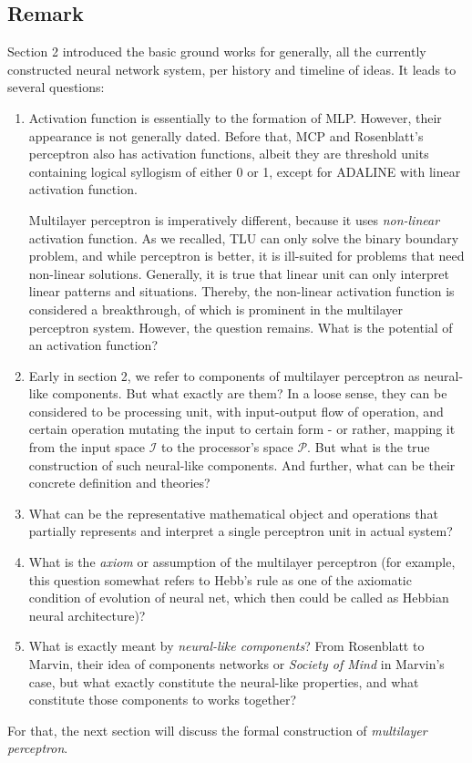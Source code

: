 \subsection{Remark}

Section 2 introduced the basic ground works for generally, all the currently constructed neural network system, per history and timeline of ideas. It leads to several questions:

\begin{enumerate}
  \item Activation function is essentially to the formation of MLP. However, their appearance is not generally dated. Before that, MCP and Rosenblatt's perceptron also has activation functions, albeit they are threshold units containing logical syllogism of either 0 or 1, except for ADALINE with linear activation function. 
  
  Multilayer perceptron is imperatively different, because it uses \textit{non-linear} activation function. As we recalled, TLU can only solve the binary boundary problem, and while perceptron is better, it is ill-suited for problems that need non-linear solutions. Generally, it is true that linear unit can only interpret linear patterns and situations. Thereby, the non-linear activation function is considered a breakthrough, of which is prominent in the multilayer perceptron system. However, the question remains. What is the potential of an activation function? 
  \item Early in section 2, we refer to components of multilayer perceptron as neural-like components. But what exactly are them? In a loose sense, they can be considered to be processing unit, with input-output flow of operation, and certain operation mutating the input to certain form - or rather, mapping it from the input space $\mathcal{I}$ to the processor's space $\mathcal{P}$. But what is the true construction of such neural-like components. And further, what can be their concrete definition and theories? 
  \item What can be the representative mathematical object and operations that partially represents and interpret a single perceptron unit in actual system? 
  \item What is the \textit{axiom} or assumption of the multilayer perceptron (for example, this question somewhat refers to Hebb's rule as one of the axiomatic condition of evolution of neural net, which then could be called as Hebbian neural architecture)? 
  \item What is exactly meant by \textit{neural-like components}? From Rosenblatt to Marvin, their idea of components networks or \textit{Society of Mind} in Marvin's case, but what exactly constitute the neural-like properties, and what constitute those components to works together? 
\end{enumerate}

For that, the next section will discuss the formal construction of \textit{multilayer perceptron}. 
